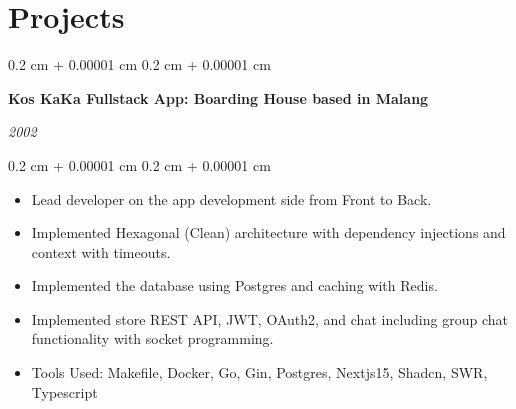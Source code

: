 \documentclass[10pt, letterpaper]{article}
\newenvironment{highlights}{
    \begin{itemize}[
        topsep=0.10 cm,
        parsep=0.10 cm,
        partopsep=0pt,
        itemsep=0pt,
        leftmargin=0.4 cm + 10pt
    ]
}{
    \end{itemize}
} %
\newenvironment{onecolentry}{
    \begin{adjustwidth}{
        0.2 cm + 0.00001 cm
    }{
        0.2 cm + 0.00001 cm
    }
}{
    \end{adjustwidth}
} %
\newenvironment{twocolentry}[2][]{
    \onecolentry
    \def\secondColumn{#2}
    \setcolumnwidth{\fill, 4.5 cm}
    \begin{paracol}{2}
}{
    \switchcolumn \raggedleft \secondColumn
    \end{paracol}
    \endonecolentry
} %
\let\hrefWithoutArrow\href
\renewcommand{\href}[2]{\hrefWithoutArrow{#1}{\ifthenelse{\equal{#2}{}}{ }{#2 }\raisebox{.15ex}{\footnotesize \faExternalLink*}}}
\begin{document}







    \section{Projects}

        \begin{twocolentry}{

        \textit{2002}}
            \textbf{Kos KaKa Fullstack App: Boarding House based in Malang}
        \end{twocolentry}

        \vspace{0.10 cm}
        \begin{onecolentry}
            \begin{highlights}
                \item Lead developer on the app development side from Front to Back.
                \item Implemented Hexagonal (Clean) architecture with dependency injections and context with timeouts.
                \item Implemented the database using Postgres and caching with Redis.
                \item Implemented store REST API, JWT, OAuth2, and chat including group chat functionality with socket programming.
                \item Tools Used: Makefile, Docker, Go, Gin, Postgres, Nextjs15, Shadcn, SWR, Typescript
            \end{highlights}
        \end{onecolentry}
\end{document}
